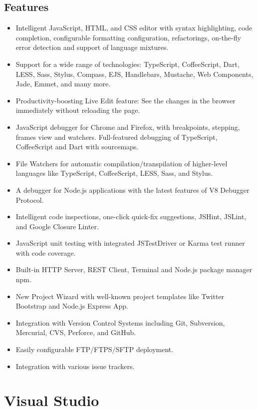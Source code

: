 \subsection{Features}
\begin{itemize}
\item Intelligent JavaScript, HTML, and CSS editor with syntax highlighting, code completion, configurable formatting configuration, refactorings, on-the-fly error detection and support of language mixtures.
\item Support for a wide range of technologies: TypeScript, CoffeeScript, Dart, LESS, Sass, Stylus, Compass, EJS, Handlebars, Mustache, Web Components, Jade, Emmet, and many more.
\item Productivity-boosting Live Edit feature: See the changes in the browser immediately without reloading the page.
\item 
JavaScript debugger for Chrome and Firefox, with breakpoints, stepping, frames view and watchers. Full-featured debugging of TypeScript, CoffeeScript and Dart with sourcemaps.
\item 
File Watchers for automatic compilation/transpilation of higher-level languages like TypeScript, CoffeeScript, LESS, Sass, and Stylus.
\item 
A debugger for Node.js applications with the latest features of V8 Debugger Protocol.
\item 
Intelligent code inspections, one-click quick-fix suggestions, JSHint, JSLint, and Google Closure Linter.
\item
JavaScript unit testing with integrated JSTestDriver or Karma test runner with code coverage. 
\item
Built-in HTTP Server, REST Client, Terminal and Node.js package manager npm. 
\item 
New Project Wizard with well-known project templates like Twitter Bootstrap and Node.js Express App.
\item
Integration with Version Control Systems including Git, Subversion, Mercurial, CVS, Perforce, and GitHub. 
\item 
Easily configurable FTP/FTPS/SFTP deployment.
\item 
Integration with various issue trackers.
\end{itemize}
















\section{Visual Studio}
